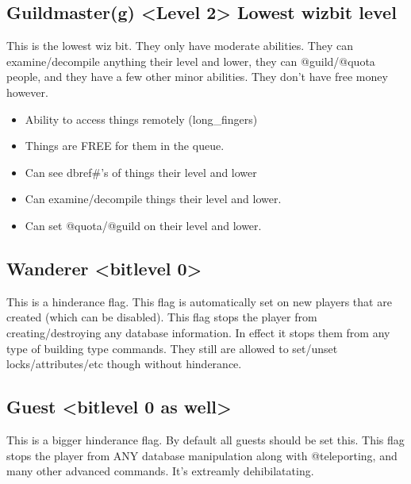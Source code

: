 \documentclass[letterpaper,10pt,english]{sphinxmanual}
\begin{document}
\subsection{Guildmaster(g) \textless{}Level 2\textgreater{} \sphinxhyphen{} Lowest wizbit level}
\label{\detokenize{toggles:guildmaster-g-level-2-lowest-wizbit-level}}
\sphinxAtStartPar
This is the lowest wiz bit.  They only have moderate abilities.
They can examine/decompile anything their level and lower, they can
@guild/@quota people, and they have a few other minor abilities.
They don’t have free money however.
\begin{itemize}
\item {} 
\sphinxAtStartPar
Ability to access things remotely (long\_fingers)

\item {} 
\sphinxAtStartPar
Things are FREE for them in the queue.

\item {} 
\sphinxAtStartPar
Can see dbref\#’s of things their level and lower

\item {} 
\sphinxAtStartPar
Can examine/decompile things their level and lower.

\item {} 
\sphinxAtStartPar
Can set @quota/@guild on their level and lower.

\end{itemize}


\subsection{Wanderer \textless{}bitlevel 0\textgreater{}}
\label{\detokenize{toggles:wanderer-bitlevel-0}}
\sphinxAtStartPar
This is a hinderance flag.  This flag is automatically set on new
players that are created (which can be disabled).  This flag stops
the player from creating/destroying any database information.   In
effect it stops them from any type of building type commands.  They
still are allowed to set/unset locks/attributes/etc though without
hinderance.


\subsection{Guest \textless{}bitlevel 0 as well\textgreater{}}
\label{\detokenize{toggles:guest-bitlevel-0-as-well}}
\sphinxAtStartPar
This is a bigger hinderance flag.  By default all guests should be
set this.  This flag stops the player from ANY database manipulation
along with @teleporting, and many other advanced commands.  It’s
extreamly dehibilatating.
\end{document}
